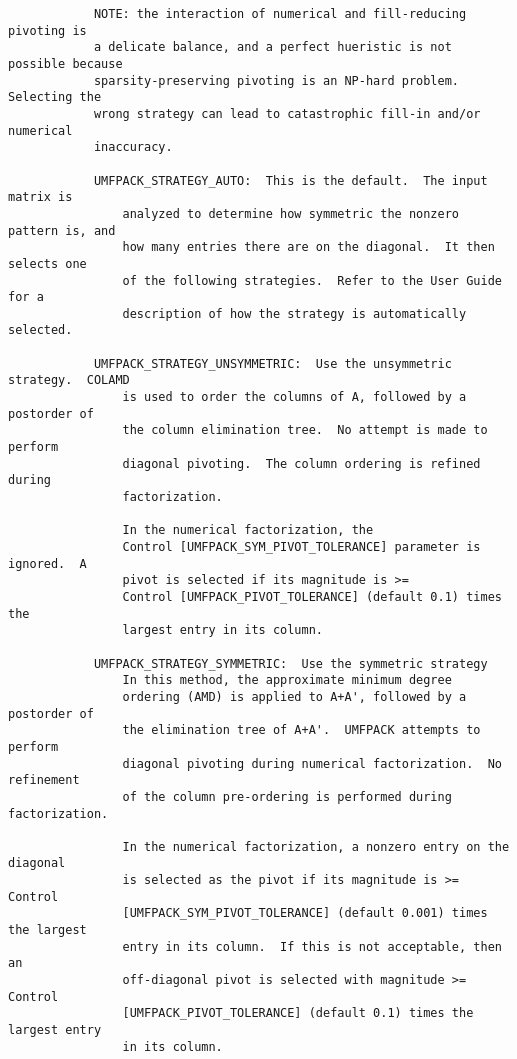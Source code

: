 \documentclass[11pt]{article}
\begin{document}
{\begin{verbatim}
            NOTE: the interaction of numerical and fill-reducing pivoting is
            a delicate balance, and a perfect hueristic is not possible because
            sparsity-preserving pivoting is an NP-hard problem.  Selecting the
            wrong strategy can lead to catastrophic fill-in and/or numerical
            inaccuracy.

            UMFPACK_STRATEGY_AUTO:  This is the default.  The input matrix is
                analyzed to determine how symmetric the nonzero pattern is, and
                how many entries there are on the diagonal.  It then selects one
                of the following strategies.  Refer to the User Guide for a
                description of how the strategy is automatically selected.

            UMFPACK_STRATEGY_UNSYMMETRIC:  Use the unsymmetric strategy.  COLAMD
                is used to order the columns of A, followed by a postorder of
                the column elimination tree.  No attempt is made to perform
                diagonal pivoting.  The column ordering is refined during
                factorization.

                In the numerical factorization, the
                Control [UMFPACK_SYM_PIVOT_TOLERANCE] parameter is ignored.  A
                pivot is selected if its magnitude is >=
                Control [UMFPACK_PIVOT_TOLERANCE] (default 0.1) times the
                largest entry in its column.

            UMFPACK_STRATEGY_SYMMETRIC:  Use the symmetric strategy
                In this method, the approximate minimum degree
                ordering (AMD) is applied to A+A', followed by a postorder of
                the elimination tree of A+A'.  UMFPACK attempts to perform
                diagonal pivoting during numerical factorization.  No refinement
                of the column pre-ordering is performed during factorization.

                In the numerical factorization, a nonzero entry on the diagonal
                is selected as the pivot if its magnitude is >= Control
                [UMFPACK_SYM_PIVOT_TOLERANCE] (default 0.001) times the largest
                entry in its column.  If this is not acceptable, then an
                off-diagonal pivot is selected with magnitude >= Control
                [UMFPACK_PIVOT_TOLERANCE] (default 0.1) times the largest entry
                in its column.


\end{verbatim}}
\end{document}
